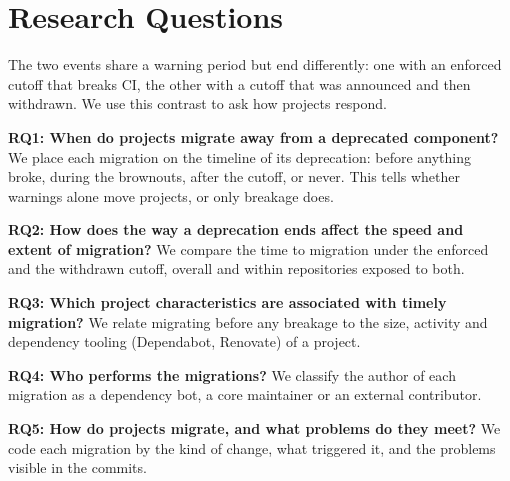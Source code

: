 \section{Research Questions}\label{sec:rqs}

The two events share a warning period but end differently: one with an enforced cutoff that breaks CI, the other with a cutoff that was announced and then withdrawn.
We use this contrast to ask how projects respond.

\textbf{RQ1: When do projects migrate away from a deprecated component?}
We place each migration on the timeline of its deprecation: before anything broke, during the brownouts, after the cutoff, or never.
This tells whether warnings alone move projects, or only breakage does.

\textbf{RQ2: How does the way a deprecation ends affect the speed and extent of migration?}
We compare the time to migration under the enforced and the withdrawn cutoff, overall and within repositories exposed to both.

\textbf{RQ3: Which project characteristics are associated with timely migration?}
We relate migrating before any breakage to the size, activity and dependency tooling (Dependabot, Renovate) of a project.

\textbf{RQ4: Who performs the migrations?}
We classify the author of each migration as a dependency bot, a core maintainer or an external contributor.

\textbf{RQ5: How do projects migrate, and what problems do they meet?}
We code each migration by the kind of change, what triggered it, and the problems visible in the commits.
